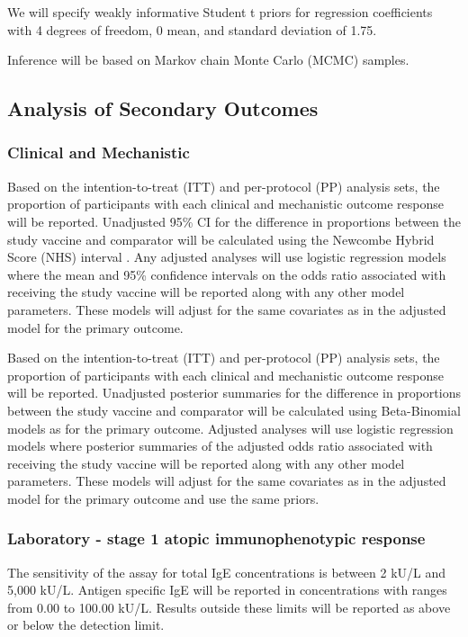 \documentclass{bmcart}
\begin{document}
We will specify weakly informative Student t priors for regression coefficients with 4 degrees of freedom, 0 mean, and standard deviation of 1.75.

Inference will be based on Markov chain Monte Carlo (MCMC) samples.

\subsection*{Analysis of Secondary Outcomes}

\subsubsection*{Clinical and Mechanistic}

Based on the intention-to-treat (ITT) and per-protocol (PP) analysis sets, the proportion of participants with each clinical and mechanistic outcome response will be reported.
Unadjusted 95\% CI for the difference in proportions between the study vaccine and comparator will be calculated using the Newcombe Hybrid Score (NHS) interval \cite{newcombe1998interval}.
Any adjusted analyses will use logistic regression models where the mean and 95\% confidence intervals on the odds ratio associated with receiving the study vaccine will be reported along with any other model parameters.
These models will adjust for the same covariates as in the adjusted model for the primary outcome.

Based on the intention-to-treat (ITT) and per-protocol (PP) analysis sets, the proportion of participants with each clinical and mechanistic outcome response will be reported.
Unadjusted posterior summaries for the difference in proportions between the study vaccine and comparator will be calculated using Beta-Binomial models as for the primary outcome.
Adjusted analyses will use logistic regression models where posterior summaries of the adjusted odds ratio associated with receiving the study vaccine will be reported along with any other model parameters.
These models will adjust for the same covariates as in the adjusted model for the primary outcome and use the same priors.

\subsubsection*{Laboratory - stage 1 atopic immunophenotypic response}

The sensitivity of the assay for total IgE concentrations is between 2 kU/L and 5,000 kU/L.
Antigen specific IgE will be reported in concentrations with ranges from 0.00 to 100.00 kU/L.
Results outside these limits will be reported as above or below the detection limit.
\end{document}
